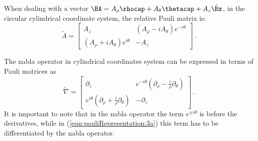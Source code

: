 When dealing with a vector $\BA= A_{\rho}\rhocap + A_{\theta}\thetacap  + A_z \hat{\Bz}$, in the circular cylindrical coordinate system, the relative Pauli matrix is: 
\begin{dmath}\label{eqn:pauliRepresentation:3a}
\tilde{A }=
\begin{bmatrix}
A_z & (A_{\rho} - i A_{\theta})e^{-i\theta} \\
(A_{\rho} + i A_{\theta})e^{i\theta} & -A_z
\end{bmatrix} \, .
\end{dmath}

The nabla operator in cylindrical coordinates system can be expressed in terms of Pauli matrices as
%
\begin{dmath}\label{eqn:pauliRepresentation:3b}
\tilde{\nabla} =
\begin{bmatrix}
\partial_z & e^{-i\theta}(\partial_{\rho} - \frac {i}{\rho} \partial_{\theta}) \\
e^{i\theta}(\partial_{\rho} + \frac {i}{\rho} \partial_{\theta}) & -\partial_z
\end{bmatrix} \, .
\end{dmath}
%
It is important to note that in the nabla operator the term $e^{\pm i\theta}$ is before the derivatives, while in (\ref{eqn:pauliRepresentation:3a}) this term has to be differentiated by the nabla operator.
